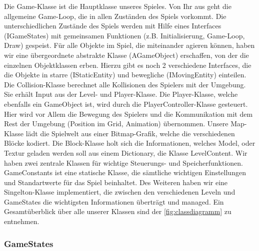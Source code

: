 \documentclass[10pt]{article}
\begin{document}
Die Game-Klasse ist die Hauptklasse unseres Spieles. Von Ihr aus geht die allgemeine Game-Loop, die in allen Zuständen des Spiels vorkommt. Die
unterschiedlichen Zustände des Spiels werden mit Hilfe eines Interfaces (IGameStates) mit gemeinsamen Funktionen (z.B. Initialisierung, Game-Loop, Draw) gespeist.
Für alle Objekte im Spiel, die miteinander agieren können, haben wir eine übergeordnete abstrakte Klasse (AGameObject) erschaffen, von der die einzelnen Objektklassen erben.
Hierzu gibt es noch 2 verschiedene Interfaces, die die Objekte in starre (IStaticEntity) und bewegliche (IMovingEntity) einteilen.
Die Collision-Klasse berechnet alle Kollisionen des Spielers mit der Umgebung. Sie erhält Input
aus der Level- und Player-Klasse.
Die Player-Klasse, welche ebenfalls ein GameObject ist, wird durch die PlayerController-Klasse
gesteuert. Hier wird vor Allem die Bewegung des Spielers und die Kommunikation mit dem Rest der Umgebung (Position im Grid, Animation) übernommen.
Unsere Map-Klasse lädt die Spielwelt aus einer Bitmap-Grafik, welche die verschiedenen Blöcke kodiert.
Die Block-Klasse holt sich die Informationen, welches Model, oder Textur geladen werden soll aus einem Dictionary, die Klasse LevelContent.
Wir haben zwei zentrale Klassen für wichtige Steuerungs- und Speicherfunktionen. GameConstants ist eine statische Klasse, die sämtliche wichtigen
Einstellungen und Standartwerte für das Spiel beinhaltet. Des Weiteren haben wir eine Singelton-Klasse implementiert, die zwischen den verschiedenen
Leveln und GameStates die wichtigsten Informationen überträgt und managed.
Ein Gesamtüberblick über alle unserer Klassen sind der \ref{fig:classdiagramm} zu entnehmen.

\vspace{0.5cm}
\subsubsection{GameStates}
\end{document}
